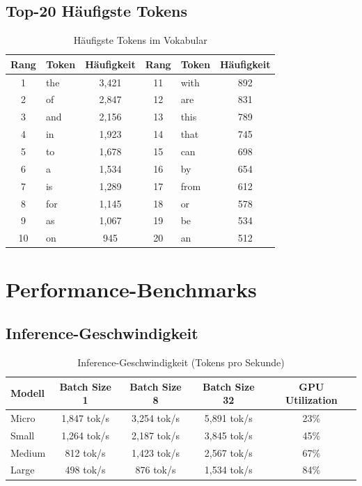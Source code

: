 \subsection{Top-20 Häufigste Tokens}

\begin{table}[h]
\centering
\begin{tabular}{|c|l|c|c|l|c|}
\hline
\textbf{Rang} & \textbf{Token} & \textbf{Häufigkeit} & \textbf{Rang} & \textbf{Token} & \textbf{Häufigkeit} \\
\hline
1 & the & 3,421 & 11 & with & 892 \\
2 & of & 2,847 & 12 & are & 831 \\
3 & and & 2,156 & 13 & this & 789 \\
4 & in & 1,923 & 14 & that & 745 \\
5 & to & 1,678 & 15 & can & 698 \\
6 & a & 1,534 & 16 & by & 654 \\
7 & is & 1,289 & 17 & from & 612 \\
8 & for & 1,145 & 18 & or & 578 \\
9 & as & 1,067 & 19 & be & 534 \\
10 & on & 945 & 20 & an & 512 \\
\hline
\end{tabular}
\caption{Häufigste Tokens im Vokabular}
\label{tab:frequent_tokens}
\end{table}

\section{Performance-Benchmarks}

\subsection{Inference-Geschwindigkeit}

\begin{table}[h]
\centering
\begin{tabular}{|l|c|c|c|c|}
\hline
\textbf{Modell} & \textbf{Batch Size 1} & \textbf{Batch Size 8} & \textbf{Batch Size 32} & \textbf{GPU Utilization} \\
\hline
Micro & 1,847 tok/s & 3,254 tok/s & 5,891 tok/s & 23\% \\
Small & 1,264 tok/s & 2,187 tok/s & 3,845 tok/s & 45\% \\
Medium & 812 tok/s & 1,423 tok/s & 2,567 tok/s & 67\% \\
Large & 498 tok/s & 876 tok/s & 1,534 tok/s & 84\% \\
\hline
\end{tabular}
\caption{Inference-Geschwindigkeit (Tokens pro Sekunde)}
\label{tab:inference_speed}
\end{table}

